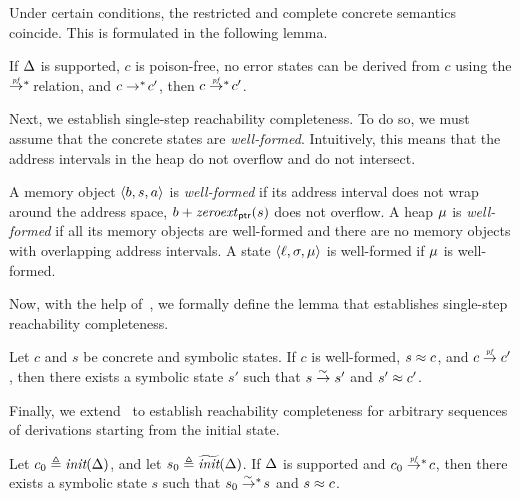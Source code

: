 Under certain conditions, the restricted and complete concrete semantics coincide.
This is formulated in the following lemma.

\begin{lemma}
\label{lemma:multi-ns-step-relative-completeness}
If $\Delta$ is supported, $c$ is poison-free, no error states can be derived from $c$ using the $\multinsstep$ relation, and $c \mathrel{{\rightarrow}{}^*\!} c'$,
then $c \multinsstep c'$.
\end{lemma}

Next, we establish single-step reachability completeness.
To do so, we must assume that the concrete states are \emph{well-formed}.
Intuitively, this means that the address intervals in the heap do not overflow and do not intersect.

\begin{definition}
\label{def:well-formed}
A memory object $\langle{b},{s},{a}\rangle$ is \emph{well-formed} if its address interval does not wrap around the address space,
\ie $b + \mathit{zeroext}_{\textsf{ptr}}(s)$ does not overflow.
A heap $\mathit{\mu}$ is \emph{well-formed} if all its memory objects are well-formed and there are no memory objects with overlapping address intervals.
A state $\langle{\ell},{\sigma},{\mathit{\mu}}\rangle$ is well-formed if $\mathit{\mu}$ is well-formed.
\end{definition}

Now, with the help of~,
we formally define the lemma that establishes single-step reachability completeness.

\begin{lemma}
\label{lemma:completeness-step}
Let $c$ and $s$ be concrete and symbolic states.
If $c$ is well-formed, $s \approx c$, and $c \nsstep c'$,
then there exists a symbolic state $s'$ such that $s \symstep s'$ and $s' \approx c'$.
\end{lemma}

Finally, we extend~ to establish reachability completeness for arbitrary sequences of derivations starting from the initial state.

\begin{theorem}
\label{theorem:completeness}
Let $c_{0} \triangleq \textit{init}(\Delta)$, and let $s_{0} \triangleq \widetilde{\textit{init}}(\Delta)$.
If $\Delta$ is supported and $c_{0} \multinsstep c$,
then there exists a symbolic state $s$ such that $s_{0} \symmultistep s$ and $s \approx c$.
\end{theorem}

